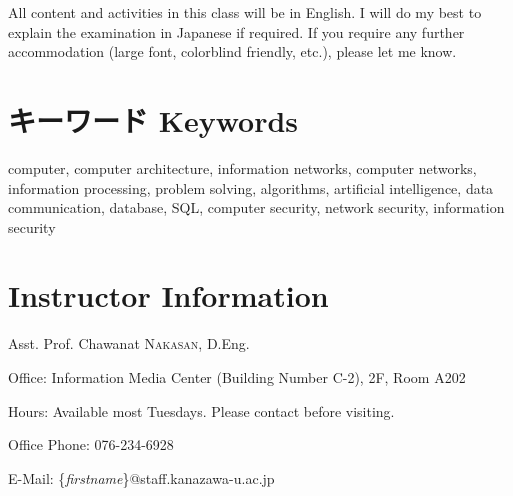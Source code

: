 \documentclass{article}
\begin{document}
All content and activities in this class will be in English. I will do my best to explain the examination in Japanese if required. If you require any further accommodation (large font, colorblind friendly, etc.), please let me know.

\section{キーワード Keywords}
computer, computer architecture, information networks, computer networks, information processing, problem solving, algorithms, artificial intelligence, data communication, database, SQL, computer security, network security, information security

\section*{Instructor Information}
Asst. Prof. Chawanat \textsc{Nakasan}, D.Eng.

\smallskip\noindent
Office: Information Media Center (Building Number C-2), 2F, Room A202

\smallskip\noindent
Hours: Available most Tuesdays. Please contact before visiting.

\smallskip\noindent
Office Phone: 076-234-6928

\smallskip\noindent
E-Mail: \{\textit{firstname}\}@staff.kanazawa-u.ac.jp
\end{document}
